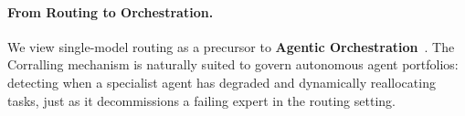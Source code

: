 \paragraph{From Routing to Orchestration.}
We view single-model routing as a precursor to \textbf{Agentic Orchestration}~\cite{wu2023autogen}. The Corralling mechanism is naturally suited to govern autonomous agent portfolios: detecting when a specialist agent has degraded and dynamically reallocating tasks, just as it decommissions a failing expert in the routing setting.
